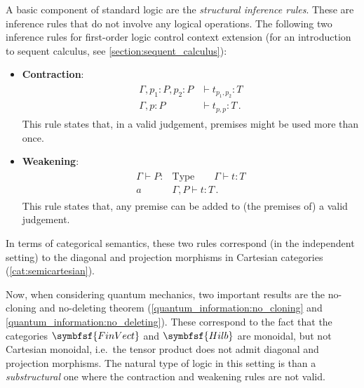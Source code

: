     A basic component of standard logic are the \textit{structural inference rules}. These are inference rules that do not involve any logical operations. The following two inference rules for first-order logic control context extension (for an introduction to sequent calculus, see \cref{section:sequent_calculus}):
    \begin{itemize}
        \item\textbf{Contraction}:
        \begin{gather}
            \begin{aligned}
                \Gamma,p_1:P,p_2:P &\vdash t_{p_1,p_2}:T\\
                \hline
                \Gamma,p:P &\vdash t_{p,p}:T\,.
            \end{aligned}
        \end{gather}
        This rule states that, in a valid judgement, premises might be used more than once.
        \item\textbf{Weakening}:
        \begin{gather}
            \begin{aligned}
                \Gamma\vdash P:&\mathrm{Type}\qquad\Gamma\vdash t:T\\
                \hline
                a&\Gamma,P\vdash t:T\,.
            \end{aligned}
        \end{gather}
        This rule states that, any premise can be added to (the premises of) a valid judgement.
    \end{itemize}
    In terms of categorical semantics, these two rules correspond (in the independent setting) to the diagonal and projection morphisms in Cartesian categories (\cref{cat:semicartesian}).

    Now, when considering quantum mechanics, two important results are the no-cloning and no-deleting theorem (\cref{quantum_information:no_cloning} and \cref{quantum_information:no_deleting}). These correspond to the fact that the categories $\symbfsf{FinVect}$ and $\symbfsf{Hilb}$ are monoidal, but not Cartesian monoidal, i.e.~the tensor product does not admit diagonal and projection morphisms. The natural type of logic in this setting is than a \textit{substructural} one where the contraction and weakening rules are not valid.

